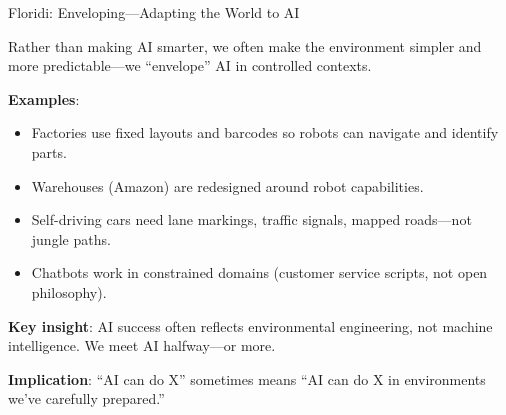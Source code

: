 ﻿\documentclass[aspectratio=169,11pt]{beamer}
\begin{document}
\begin{frame}{Floridi: Enveloping---Adapting the World to AI}
\begin{conceptbox}
\small
Rather than making AI smarter, we often make the environment simpler and more predictable---we ``envelope'' AI in controlled contexts.
\end{conceptbox}

\vspace{0.2em}
\textbf{Examples}:
\begin{itemize}
    \item Factories use fixed layouts and barcodes so robots can navigate and identify parts.
    \item Warehouses (Amazon) are redesigned around robot capabilities.
    \item Self-driving cars need lane markings, traffic signals, mapped roads---not jungle paths.
    \item Chatbots work in constrained domains (customer service scripts, not open philosophy).
\end{itemize}

\vspace{0.2em}
\textbf{Key insight}: AI success often reflects environmental engineering, not machine intelligence. We meet AI halfway---or more.

\vspace{0.2em}
\textbf{Implication}: ``AI can do X'' sometimes means ``AI can do X in environments we've carefully prepared.''
\end{frame}
\end{document}
